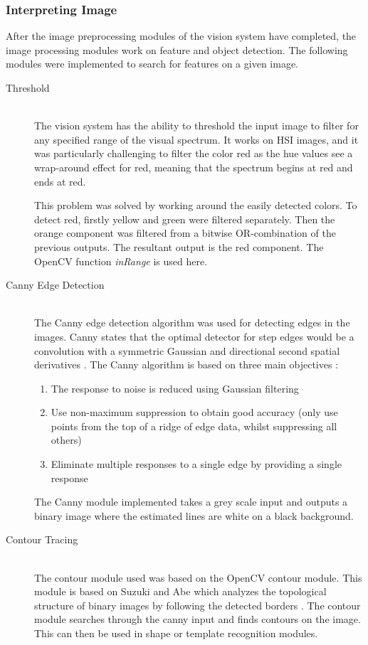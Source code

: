 \subsubsection{Interpreting Image} 
After the image preprocessing modules of the vision system have completed, the image processing modules work on feature and object detection. The following modules were implemented to search for features on a given image. 
\begin{description}
\item[Threshold]\hfill \\
The vision system has the ability to threshold the input image to filter for any specified range of the visual spectrum. 
It works on HSI images, and it was particularly challenging to filter the color red as the hue values see a wrap-around effect for red, meaning that the spectrum begins at red and ends at red.

This problem was solved by working around the easily detected colors. To detect red, firstly yellow and green were filtered separately. Then the orange component was filtered from a bitwise OR-combination of the previous outputs. The resultant output is the red component.
The OpenCV function \emph{inRange} is used here.

\item[Canny Edge Detection]\hfill \\
The Canny edge detection algorithm \cite{Canny:1986:CAE:11274.11275}  was used for detecting edges in the images. Canny states that the optimal detector for step edges would be a convolution with a symmetric Gaussian and directional second spatial derivatives \cite{books/sp/Cipolla96}. The Canny algorithm is based on three main objectives \cite{Nixon:2008:FEI:1571711}:
\begin{enumerate}
  \item The response to noise is reduced using Gaussian filtering
  \item Use non-maximum suppression to obtain good accuracy (only use points from the top of a ridge of edge data, whilst suppressing all others)
  \item Eliminate multiple responses to a single edge by providing a single response
\end{enumerate}

The Canny module implemented takes a grey scale input and outputs a binary image where the estimated lines are white on a black background.

\item[Contour Tracing]\hfill \\
The contour module used was based on the OpenCV contour module. This module is based on Suzuki and Abe which analyzes the topological structure of binary
images by following the detected borders \cite{article:suzuki}. 
The contour module searches through the canny input and finds contours on the image. This can then be used in shape or template recognition modules.


\end{description}
